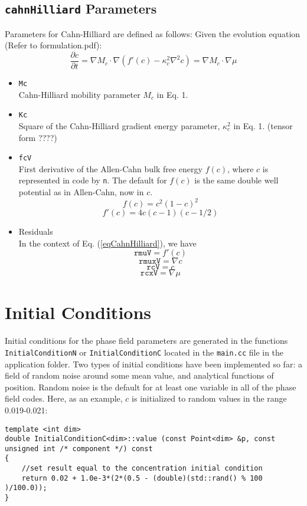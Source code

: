 \documentclass[11pt]{article}
\begin{document}
\subsection{\texttt{cahnHilliard} Parameters}
Parameters for Cahn-Hilliard are defined as follows:
Given the evolution equation (Refer to formulation.pdf):
\begin{equation}
\frac{\partial c}{\partial t} = \nabla M_c \cdot \nabla \left( f'(c) - \kappa_c^2 \nabla^2 c \right) = \nabla M_c \cdot \nabla \mu
\label{eqCahnHilliard}
\end{equation}
\begin{itemize}
\item \texttt{Mc} \\
	Cahn-Hilliard mobility parameter $M_c$ in Eq. 1.
\item \texttt{Kc} \\
	Square of the Cahn-Hilliard gradient energy parameter, $\kappa_c^2$ in Eq. 1.  (tensor form ????)
\item \texttt{fcV} \\
	First derivative of the Allen-Cahn bulk free energy $f(c)$, where $c$ is represented in code by \texttt{n}.  The default for $f(c)$ is the same double well potential as in Allen-Cahn, now in $c$.
	\[ f(c) = c^2 (1-c)^2 \]
	\[ f'(c) = 4c (c -1)(c - 1/2) \]
\item Residuals \\
	In the context of Eq. (\ref{eqCahnHilliard}), we have
	\[ \texttt{rmuV} = f'(c) \]
	\[ \texttt{rmuxV} = \nabla c \]
	\[ \texttt{rcV} = c \]
	\[ \texttt{rcxV} = \nabla \mu \]
\end{itemize}

\section{Initial Conditions}
\paragraph{}
Initial conditions for the phase field parameters are generated in the functions \\ \texttt{InitialConditionN} or \texttt{InitialConditionC} located in the \texttt{main.cc} file in the application folder.  Two types of initial conditions have been implemented so far: a field of random noise around some mean value, and analytical functions of position.  Random noise is the default for at least one variable in all of the phase field codes.  Here, as an example, $c$ is initialized to random values in the range 0.019-0.021:
\begin{lstlisting}
template <int dim>
double InitialConditionC<dim>::value (const Point<dim> &p, const unsigned int /* component */) const
{
	//set result equal to the concentration initial condition
	return 0.02 + 1.0e-3*(2*(0.5 - (double)(std::rand() % 100 )/100.0));
}
\end{lstlisting}
\end{document}

